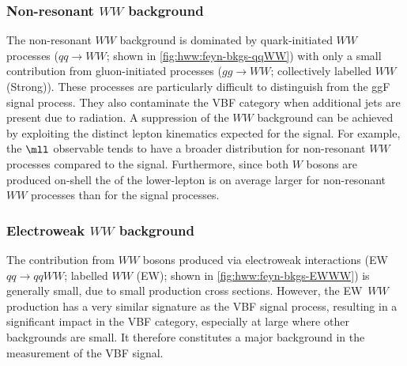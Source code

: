 \subsubsection{Non-resonant $WW$ background}
The non-resonant $WW$ background is dominated by quark-initiated $WW$ processes ($qq \to WW$; shown in \cref{fig:hww:feyn-bkgs-qqWW}) with only a small contribution from gluon-initiated processes ($gg \to WW$; collectively labelled $WW$ (Strong)).
These processes are particularly difficult to distinguish from the ggF signal process.
They also contaminate the VBF \TwoJet category when additional jets are present due to radiation. 
A suppression of the $WW$ background can be achieved by exploiting the distinct lepton kinematics expected for the signal. For example, the $\mll$ observable tends to have a broader distribution for non-resonant $WW$ processes compared to the signal. 
Furthermore, since both $W$ bosons are produced on-shell the \pT of the lower-\pT lepton is on average larger for non-resonant $WW$ processes than for the signal processes. 

\subsubsection{Electroweak $WW$ background}
The contribution from $WW$ bosons produced via electroweak interactions (EW $qq \to qqWW$; labelled $WW$ (EW); shown in \cref{fig:hww:feyn-bkgs-EWWW}) is generally small, due to small production cross sections. However, the EW~$WW$ production has a very similar signature as the VBF signal process, resulting in a significant impact in the VBF category, especially at large \mjj where other backgrounds are small. 
It therefore constitutes a major background in the measurement of the VBF signal. 

